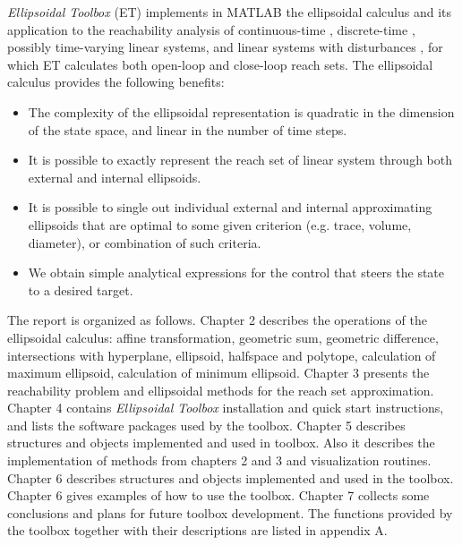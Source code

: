 {\it Ellipsoidal Toolbox} (ET) implements in MATLAB
the ellipsoidal calculus \cite{kurvalyi}
and its application to the reachability analysis of continuous-time
\cite{kurvar}, discrete-time \cite{pvak}, possibly time-varying linear systems,
and linear systems with disturbances \cite{kurvar2},
for which ET calculates both open-loop and close-loop reach sets.
The ellipsoidal calculus provides the following benefits:
\begin{itemize}
\item The complexity of the
ellipsoidal representation is quadratic in the dimension of
the state space, and linear in the number of time steps.
\item It is possible to exactly represent the reach set of
linear system through both external and internal ellipsoids.
\item It is possible to single out individual external and internal
approximating ellipsoids that are optimal to some given criterion
(e.g. trace, volume, diameter), or combination of such criteria.
\item We obtain simple analytical expressions for the control
that steers the state to a desired target.
\end{itemize}
The report is organized as follows.
\newline
Chapter 2 describes the operations of the
ellipsoidal calculus: affine transformation, geometric sum,
geometric difference, intersections with
hyperplane, ellipsoid, halfspace and polytope, calculation of maximum ellipsoid,
calculation of minimum ellipsoid.
\newline
Chapter 3 presents the reachability problem and ellipsoidal methods for
the reach set approximation.
\newline
Chapter 4 contains {\it Ellipsoidal Toolbox} installation and quick start
instructions, and lists the software packages used by the toolbox.
\newline
Chapter 5 describes structures and objects implemented and used in toolbox.
Also it describes the implementation of methods from chapters 2 and 3
and visualization routines.
\newline
Chapter 6 describes structures and objects implemented and
used in the toolbox.
\newline
Chapter 6 gives examples of how to use the toolbox.
\newline
Chapter 7 collects some conclusions and plans for future toolbox development.
\newline
The functions provided by the toolbox together with their descriptions
are listed in appendix A.
